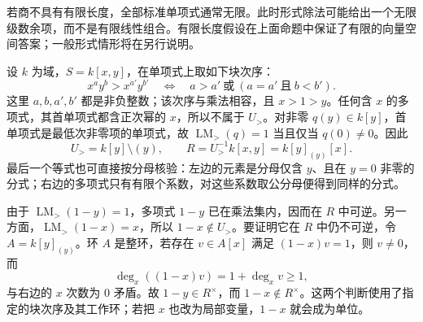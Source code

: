 若商不具有有限长度，全部标准单项式通常无限。此时形式除法可能给出一个无限级数余项，而不是有限线性组合。有限长度假设在上面命题中保证了有限的向量空间答案；一般形式情形将在另行说明。

\begin{example}\label{b3:exm:F-mixed-order}
	设 \(k\) 为域，\(S=k[x,y]\)，在单项式上取如下块次序：
	\[
		x^a y^b>x^{a'}y^{b'} \quad\Longleftrightarrow\quad a>a'\ \text{或}\ (a=a'\ \text{且}\ b<b').
	\]
	这里 \(a,b,a',b'\) 都是非负整数；该次序与乘法相容，且 \(x>1>y\)。任何含 \(x\) 的多项式，其首单项式都含正次幂的 \(x\)，所以不属于 \(U_{>}\)。对非零 \(q(y)\in k[y]\)，首单项式是最低次非零项的单项式，故 \(\operatorname{LM}_{>}(q)=1\) 当且仅当 \(q(0)\ne0\)。因此
	\[
		U_{>}=k[y]\setminus(y),\qquad R=U_{>}^{-1}k[x,y]=k[y]_{(y)}[x].
	\]
	最后一个等式也可直接按分母核验：左边的元素是分母仅含 \(y\)、且在 \(y=0\) 非零的分式；右边的多项式只有有限个系数，对这些系数取公分母便得到同样的分式。

	由于 \(\operatorname{LM}_{>}(1-y)=1\)，多项式 \(1-y\) 已在乘法集内，因而在 \(R\) 中可逆。另一方面，\(\operatorname{LM}_{>}(1-x)=x\)，所以 \(1-x\notin U_{>}\)。要证明它在 \(R\) 中仍不可逆，令 \(A=k[y]_{(y)}\)。环 \(A\) 是整环，若存在 \(v\in A[x]\) 满足 \((1-x)v=1\)，则 \(v\ne0\)，而
	\[
		\deg_x((1-x)v)=1+\deg_x v\ge1,
	\]
	与右边的 \(x\) 次数为 \(0\) 矛盾。故 \(1-y\in R^\times\)，而 \(1-x\notin R^\times\)。这两个判断使用了指定的块次序及其工作环；若把 \(x\) 也改为局部变量，\(1-x\) 就会成为单位。
\end{example}
